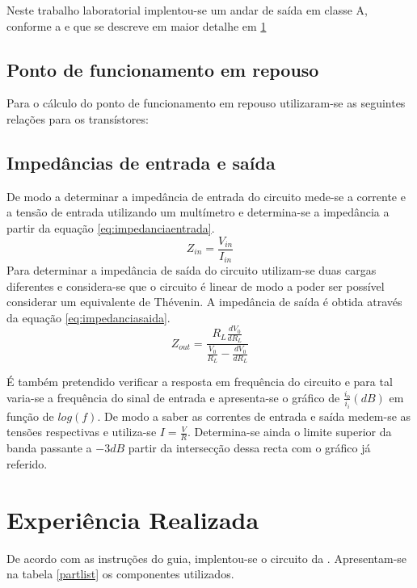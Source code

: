 \documentclass[%
  reprint,
  nofootinbib,
  amsmath,amssymb,
  aps,
  10pt,
  a4paper
]{revtex4-1}
\begin{document}

Neste trabalho laboratorial implentou-se um andar de saída em classe A, conforme a  e que se descreve em maior detalhe em \ref{s:expreal}

\subsection{Ponto de funcionamento em repouso}
Para o cálculo do ponto de funcionamento em repouso utilizaram-se as seguintes relações para os transístores:


\subsection{Impedâncias de entrada e saída}

De modo a determinar a impedância de entrada do circuito mede-se a corrente e a tensão de entrada utilizando um multímetro e determina-se a impedância a partir da equação \ref{eq:impedanciaentrada}.
\begin{equation}
Z_{in}=\frac{V_{in}}{I_{in}}
\label{eq:impedanciaentrada}
\end{equation}
Para determinar a impedância de saída do circuito utilizam-se duas cargas diferentes e considera-se que o circuito é linear de modo a poder ser possível considerar um equivalente de Thévenin. A impedância de saída é obtida através da equação \ref{eq:impedanciasaida}.
\begin{equation}
Z_{out}=\frac{R_L \frac{dV_0}{dR_L}}{\frac{V_0}{R_L}-\frac{dV_0}{dR_L}}
\label{eq:impedanciasaida}
\end{equation}

É também pretendido verificar a resposta em frequência do circuito e para tal varia-se a frequência do sinal de entrada e apresenta-se o gráfico de $\frac{i_0}{i_i} (dB)$ em função de $log(f)$. De modo a saber as correntes de entrada e saída medem-se as tensões respectivas e utiliza-se $I=\frac{V}{R}$. Determina-se ainda o limite superior da banda passante a $-3dB$ partir da intersecção dessa recta com o gráfico já referido. 


\section{Experiência Realizada}
\label{s:expreal}
De acordo com as instruções do guia, implentou-se o circuito da . Apresentam-se na tabela \ref{partlist} os componentes utilizados.
\end{document}
